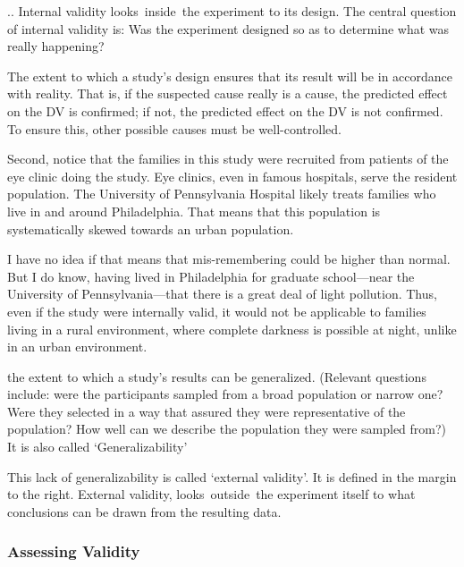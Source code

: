 \begin{refsection}
.. Internal validity looks inside the experiment to its design. The central question of internal validity is: Was the experiment designed so as to determine what was really happening?
\begin{thesis}
The extent to which a study’s design ensures that its result will be in accordance with reality. That is, if the suspected cause really is a cause, the predicted effect on the DV is confirmed; if not, the predicted effect on the DV is not confirmed. To ensure this, other possible causes must be well-controlled.
\end{thesis}

Second, notice that the families in this study were recruited from patients of the eye clinic doing the study. Eye clinics, even in famous hospitals, serve the resident population. The University of Pennsylvania Hospital likely treats families who live in and around Philadelphia. That means that this population is systematically skewed towards an urban population.

I have no idea if that means that mis-remembering could be higher than normal. But I do know, having lived in Philadelphia for graduate school---near the University of Pennsylvania---that there is a great deal of light pollution. Thus, even if the study were internally valid, it would not be applicable to families living in a rural environment, where complete darkness is possible at night, unlike in an urban environment.\begin{thesis}
the extent to which a study’s results can be generalized. (Relevant questions include: were the participants sampled from a broad population or narrow one? Were they selected in a way that assured they were representative of the population? How well can we describe the population they were sampled from?)\newline
It is also called ‘Generalizability’
\end{thesis}

This lack of generalizability is called ‘external validity’. It is defined in the margin to the right. External validity, looks outside the experiment itself to what conclusions can be drawn from the resulting data.

\subsubsection{Assessing Validity}
\label{assessingvalidity}


\end{refsection}

